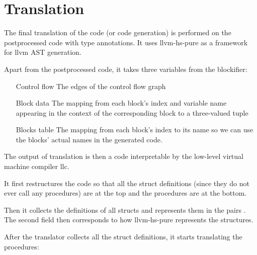 
\section{Translation}

The final translation of the code (or code generation) is performed on the postprocessed code with type annotations. It uses  llvm-hs-pure as a framework for llvm AST generation.

Apart from the postprocessed code, it takes three variables from the blockifier:


\begin{enumerate}
    \item[Control flow] The edges of the control flow graph
    \item[Block data] The mapping from each block's index and variable name appearing in the context of the corresponding block to a three-valued tuple \linebreak {}
    \item[Blocks table] The mapping from each block's index to its name so we can use the blocks' actual names in the generated code.
\end{enumerate}

The output of translation is then a code interpretable by the low-level virtual machine compiler llc.

It first restructures the code so that all the struct definitions (since they do not ever call any procedures) are at the top and the procedures are at the bottom.

Then it collects the definitions of all structs and represents them in the pairs \linebreak {}. The second field then corresponds to how llvm-hs-pure represents the structures.

After the translator collects all the struct definitions, it starts translating the procedures:

